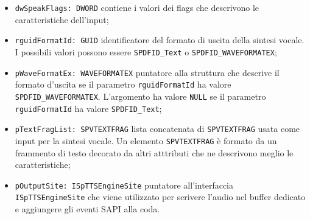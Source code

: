\begin{itemize}
	\begin{itemize}
		\item \texttt{dwSpeakFlags: DWORD} contiene i valori dei flags che descrivono le caratteristiche dell'input;
		\item \texttt{rguidFormatId: GUID} identificatore del formato di uscita della sintesi vocale. I possibili valori possono essere \texttt{SPDFID\_Text} o \texttt{SPDFID\_WAVEFORMATEX};
		\item \texttt{pWaveFormatEx: WAVEFORMATEX} puntatore alla struttura che descrive il formato d'uscita se il parametro \texttt{rguidFormatId} ha valore \texttt{SPDFID\_WAVEFORMATEX}. L'argomento ha valore \texttt{NULL} se il parametro \texttt{rguidFormatId} ha valore \texttt{SPDFID\_Text};
		\item \texttt{pTextFragList: SPVTEXTFRAG} lista concatenata di \texttt{SPVTEXTFRAG} usata come input per la sintesi vocale. Un elemento \texttt{SPVTEXTFRAG} è formato da un frammento di testo decorato da altri atttributi che ne descrivono meglio le caratteristiche;
		\item \texttt{pOutputSite: ISpTTSEngineSite} puntatore all'interfaccia\\ \texttt{ISpTTSEngineSite} che viene utilizzato per scrivere l'audio nel buffer dedicato e aggiungere gli eventi SAPI alla coda.
	\end{itemize}  
\end{itemize}

